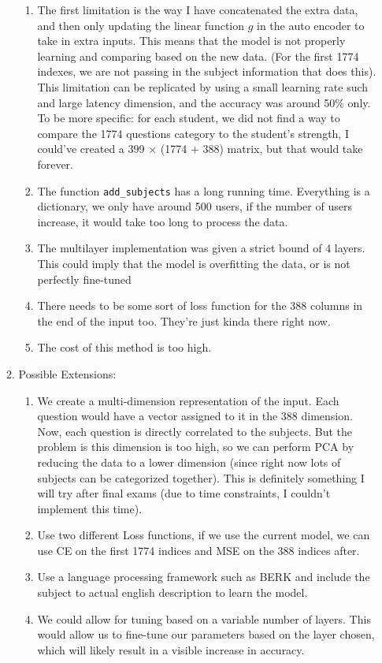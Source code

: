 \documentclass{article}
\begin{document}
\begin{enumerate}
\begin{enumerate}
\begin{enumerate}
    \item The first limitation is the way I have concatenated the extra data, and then only updating the linear function $g$ in the auto encoder to take in extra inputs. This means that the model is not properly learning and comparing based on the new data. (For the first 1774 indexes, we are not passing in the subject information that does this). This limitation can be replicated by using a small learning rate such and large latency dimension, and the accuracy was around 50\% only. To be more specific: for each student, we did not find a way to compare the 1774 questions category to the student's strength, I could've created a 399 $\times$ (1774 + 388) matrix, but that would take forever. 
    \item The function \texttt{add\_subjects} has a long running time. Everything is a dictionary, we only have around 500 users, if the number of users increase, it would take too long to process the data. 
    \item The multilayer implementation was given a strict bound of 4 layers. This could imply that the model is overfitting the data, or is not perfectly fine-tuned
    \item There needs to be some sort of loss function for the 388 columns in the end of the input too. They're just kinda there right now. 
    \item The cost of this method is too high. 
\end{enumerate}
    \item Possible Extensions:
    \begin{enumerate}
        \item We create a multi-dimension representation of the input. Each question would have a vector assigned to it in the 388 dimension. Now, each question is directly correlated to the subjects. But the problem is this dimension is too high, so we can perform PCA by reducing the data to a lower dimension (since right now lots of subjects can be categorized together). This is definitely something I will try after final exams (due to time constraints, I couldn't implement this time).
        \item Use two different Loss functions, if we use the current model, we can use CE on the first 1774 indices and MSE on the 388 indices after. 
        \item Use a language processing framework such as BERK and include the subject to actual english description to learn the model. 
        \item We could allow for tuning based on a variable number of layers. This would allow us to fine-tune our parameters based on the layer chosen, which will likely result in a visible increase in accuracy.
        

\end{enumerate}
\end{enumerate}
\end{enumerate}
\end{document}
